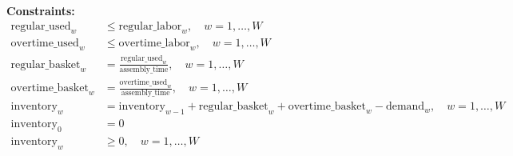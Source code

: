 \documentclass{article}
\begin{document}
\textbf{Constraints:}
\begin{align*}
\text{regular\_used}_{w} & \leq \text{regular\_labor}_{w}, \quad w = 1, \ldots, W \\
\text{overtime\_used}_{w} & \leq \text{overtime\_labor}_{w}, \quad w = 1, \ldots, W \\
\text{regular\_basket}_{w} & = \frac{\text{regular\_used}_{w}}{\text{assembly\_time}}, \quad w = 1, \ldots, W \\
\text{overtime\_basket}_{w} & = \frac{\text{overtime\_used}_{w}}{\text{assembly\_time}}, \quad w = 1, \ldots, W \\
\text{inventory}_{w} & = \text{inventory}_{w-1} + \text{regular\_basket}_{w} + \text{overtime\_basket}_{w} - \text{demand}_{w}, \quad w = 1, \ldots, W \\
\text{inventory}_{0} & = 0 \\
\text{inventory}_{w} & \geq 0, \quad w = 1, \ldots, W
\end{align*}
\end{document}
